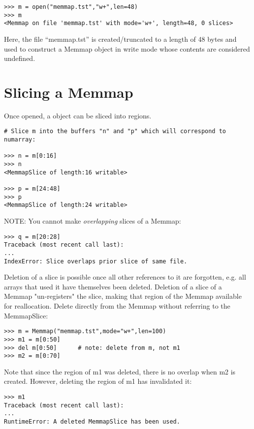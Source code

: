 \begin{verbatim}
>>> m = open("memmap.tst","w+",len=48)
>>> m
<Memmap on file 'memmap.tst' with mode='w+', length=48, 0 slices>
\end{verbatim}

Here, the file ``memmap.tst'' is created/truncated to a length of 48
bytes and used to construct a Memmap object in write mode whose
contents are considered undefined.  

\section{Slicing a Memmap}
\label{sec:memmap-slicing}

Once opened, a  object can be sliced into regions.

\begin{verbatim}
# Slice m into the buffers "n" and "p" which will correspond to numarray:

>>> n = m[0:16]
>>> n
<MemmapSlice of length:16 writable>

>>> p = m[24:48]
>>> p
<MemmapSlice of length:24 writable>
\end{verbatim}

NOTE: You cannot make \emph{overlapping} slices of a Memmap:

\begin{verbatim}
>>> q = m[20:28]
Traceback (most recent call last):
...
IndexError: Slice overlaps prior slice of same file.
\end{verbatim}

Deletion of a slice is possible once all other references to it are
forgotten, e.g. all arrays that used it have themselves been deleted.
Deletion of a slice of a Memmap "un-registers" the slice, making that
region of the Memmap available for reallocation.  Delete directly from
the Memmap without referring to the MemmapSlice:

\begin{verbatim}
>>> m = Memmap("memmap.tst",mode="w+",len=100)
>>> m1 = m[0:50]
>>> del m[0:50]      # note: delete from m, not m1
>>> m2 = m[0:70]
\end{verbatim}

Note that since the region of m1 was deleted, there is no overlap when
m2 is created.  However, deleting the region of m1 has invalidated it:

\begin{verbatim}
>>> m1
Traceback (most recent call last):
...
RuntimeError: A deleted MemmapSlice has been used.
\end{verbatim}

